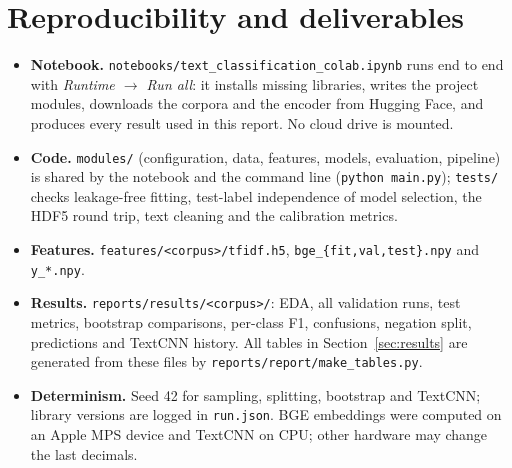 \section{Reproducibility and deliverables}
\label{sec:repro}

\begin{itemize}
  \item \textbf{Notebook.} \texttt{notebooks/text\_classification\_colab.ipynb} runs end to end with \emph{Runtime $\rightarrow$ Run all}: it installs missing libraries, writes the project modules, downloads the corpora and the encoder from Hugging Face, and produces every result used in this report. No cloud drive is mounted.
  \item \textbf{Code.} \texttt{modules/} (configuration, data, features, models, evaluation, pipeline) is shared by the notebook and the command line (\texttt{python main.py}); \texttt{tests/} checks leakage-free fitting, test-label independence of model selection, the HDF5 round trip, text cleaning and the calibration metrics.
  \item \textbf{Features.} \texttt{features/<corpus>/tfidf.h5}, \texttt{bge\_\{fit,val,test\}.npy} and \texttt{y\_*.npy}.
  \item \textbf{Results.} \texttt{reports/results/<corpus>/}: EDA, all validation runs, test metrics, bootstrap comparisons, per-class F1, confusions, negation split, predictions and TextCNN history. All tables in Section~\ref{sec:results} are generated from these files by \texttt{reports/report/make\_tables.py}.
  \item \textbf{Determinism.} Seed 42 for sampling, splitting, bootstrap and TextCNN; library versions are logged in \texttt{run.json}. BGE embeddings were computed on an Apple MPS device and TextCNN on CPU; other hardware may change the last decimals.
\end{itemize}
